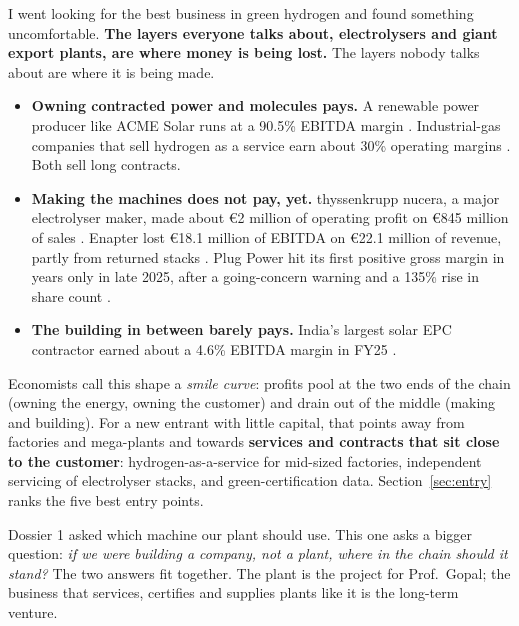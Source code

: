 
I went looking for the best business in green hydrogen and found something uncomfortable. \textbf{The layers everyone talks about, electrolysers and giant export plants, are where money is being lost.} The layers nobody talks about are where it is being made.

\begin{itemize}
\item \textbf{Owning contracted power and molecules pays.} A renewable power producer like ACME Solar runs at a 90.5\% EBITDA margin \cite{acmefy25} \rep. Industrial-gas companies that sell hydrogen as a service earn about 30\% operating margins \cite{linde2026} \rep. Both sell long contracts.
\item \textbf{Making the machines does not pay, yet.} thyssenkrupp nucera, a major electrolyser maker, made about €2 million of operating profit on €845 million of sales \cite{nucera2025} \rep. Enapter lost €18.1 million of EBITDA on €22.1 million of revenue, partly from returned stacks \cite{enapter2026} \rep. Plug Power hit its first positive gross margin in years only in late 2025, after a going-concern warning and a 135\% rise in share count \cite{plug2026,plugfool2026} \rep.
\item \textbf{The building in between barely pays.} India's largest solar EPC contractor earned about a 4.6\% EBITDA margin in FY25 \cite{sw2025} \estd.
\end{itemize}

Economists call this shape a \emph{smile curve}: profits pool at the two ends of the chain (owning the energy, owning the customer) and drain out of the middle (making and building). For a new entrant with little capital, that points away from factories and mega-plants and towards \textbf{services and contracts that sit close to the customer}: hydrogen-as-a-service for mid-sized factories, independent servicing of electrolyser stacks, and green-certification data. Section~\ref{sec:entry} ranks the five best entry points.

\vspace{4pt}

\begin{plainwords}
Dossier 1 asked which machine our plant should use. This one asks a bigger question: \emph{if we were building a company, not a plant, where in the chain should it stand?} The two answers fit together. The plant is the project for Prof.\ Gopal; the business that services, certifies and supplies plants like it is the long-term venture.
\end{plainwords}
\newpage

